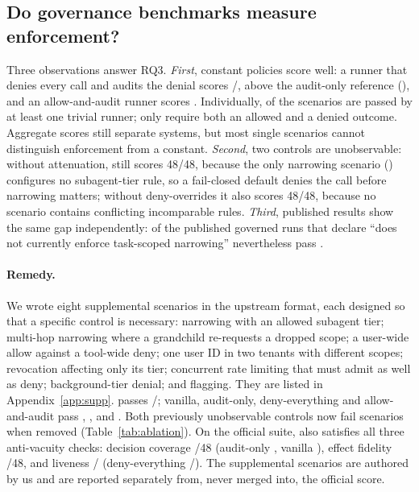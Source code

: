 \subsection{Do governance benchmarks measure enforcement?}
\label{sec:vacuity}
Three observations answer RQ3. \emph{First}, constant policies score well: a runner that denies every call and audits the denial scores \AGBDenyAll{}/\AGBTotal{}, above the audit-only reference (\AGBAuditOnly{}), and an allow-and-audit runner scores \AGBAllowAll{}. Individually, \VacuousAny{} of the \AGBTotal{} scenarios are passed by at least one trivial runner; only \VacuousNone{} require both an allowed and a denied outcome. Aggregate scores still separate systems, but most single scenarios cannot distinguish enforcement from a constant. \emph{Second}, two controls are unobservable: without attenuation, \method{} still scores 48/48, because the only narrowing scenario () configures no subagent-tier rule, so a fail-closed default denies the call before narrowing matters; without deny-overrides it also scores 48/48, because no scenario contains conflicting incomparable rules. \emph{Third}, published results show the same gap independently: \ACPDeclaredNarrowingPassed{} of the \ACPDeclaredNarrowing{} published governed runs that declare ``does not currently enforce task-scoped narrowing'' nevertheless pass .

\paragraph{Remedy.} We wrote eight supplemental scenarios in the upstream format, each designed so that a specific control is necessary: narrowing with an allowed subagent tier; multi-hop narrowing where a grandchild re-requests a dropped scope; a user-wide allow against a tool-wide deny; one user ID in two tenants with different scopes; revocation affecting only its tier; concurrent rate limiting that must admit as well as deny; background-tier denial; and flagging. They are listed in Appendix~\ref{app:supp}. \method{} passes \SuppFoundry{}/\SuppTotal{}; vanilla, audit-only, deny-everything and allow-and-audit pass \SuppVanilla{}, \SuppAuditOnly{}, \SuppDenyAll{} and \SuppAllowAll{}. Both previously unobservable controls now fail scenarios when removed (Table~\ref{tab:ablation}). On the official suite, \method{} also satisfies all three anti-vacuity checks: decision coverage \AVCoverage{}/48 (audit-only \AVAuditOnlyCoverage{}, vanilla \AVVanillaCoverage{}), effect fidelity \AVFidelity{}/48, and liveness \AVLiveness{}/\AVLivenessApplicable{} (deny-everything \AVDenyAllLiveness{}/\AVLivenessApplicable{}). The supplemental scenarios are authored by us and are reported separately from, never merged into, the official score.

